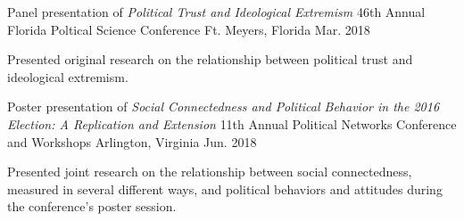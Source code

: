 

\begin{cventries}

  \cventry
    {Panel presentation of \emph{Political Trust and Ideological Extremism}} %
    {46th Annual Florida Poltical Science Conference} %
    {Ft. Meyers, Florida} %
    {Mar. 2018} %
    {
      \begin{cvitems} %
        \item {Presented original research on the relationship between political trust and ideological extremism.}
      \end{cvitems}
    }

  \cventry
    {Poster presentation of \emph{Social Connectedness and Political Behavior in the 2016 Election: A Replication and Extension}} %
    {11th Annual Political Networks Conference and Workshops} %
    {Arlington, Virginia} %
    {Jun. 2018} %
    {
      \begin{cvitems} %
        \item {Presented joint research on the relationship between social connectedness, measured in several different ways, and political behaviors and attitudes during the conference's poster session.}
      \end{cvitems}
    }

\end{cventries}
